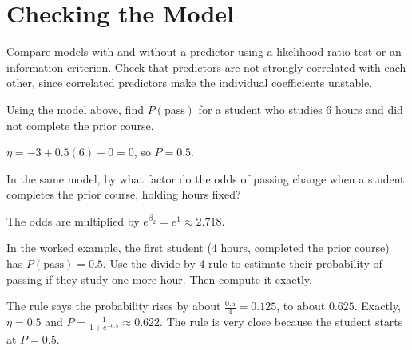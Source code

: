 \section{Checking the Model}
Compare models with and without a predictor using a likelihood ratio test or an information criterion. Check
that predictors are not strongly correlated with each other, since correlated predictors make the individual
coefficients unstable.

\begin{Exercise}[label=mlog1, title=Compute a probability]
Using the model above, find $P(\text{pass})$ for a student who studies 6 hours and did not complete the prior course.
\end{Exercise}
\begin{Answer}[ref=mlog1]
$\eta = -3 + 0.5(6) + 0 = 0$, so $P = 0.5$.
\end{Answer}

\begin{Exercise}[label=mlog2, title=Odds ratio]
In the same model, by what factor do the odds of passing change when a student completes the prior course, holding hours fixed?
\end{Exercise}
\begin{Answer}[ref=mlog2]
The odds are multiplied by $e^{\beta_2} = e^{1} \approx 2.718$.
\end{Answer}

\begin{Exercise}[label=mlog3, title=Divide by 4]
In the worked example, the first student (4 hours, completed the prior course)
has $P(\text{pass}) = 0.5$. Use the divide-by-4 rule to estimate their
probability of passing if they study one more hour. Then compute it exactly.
\end{Exercise}
\begin{Answer}[ref=mlog3]
The rule says the probability rises by about $\frac{0.5}{4} = 0.125$, to about $0.625$.
Exactly, $\eta = 0.5$ and $P = \frac{1}{1 + e^{-0.5}} \approx 0.622$. The rule is
very close because the student starts at $P = 0.5$.
\end{Answer}

